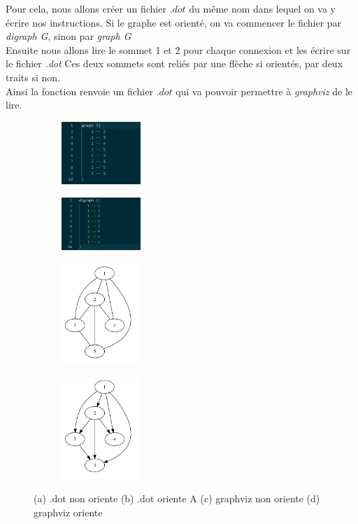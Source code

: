 \documentclass[a4paper]{article}
\begin{document}
Pour cela, nous allons créer un fichier $.dot$ du même nom dans lequel on va y écrire nos instructions.
Si le graphe est orienté, on va commencer le fichier par \emph{digraph G}, sinon par \emph{graph G}\\
Ensuite nous allons lire le sommet 1 et 2 pour chaque connexion et les écrire sur le fichier \emph{.dot}
Ces deux sommets sont reliés par une flèche si orientés, par deux traits si non.\\
Ainsi la fonction renvoie un fichier $.dot$ qui va pouvoir permettre à \emph{graphviz} de le lire.\\  
\hfill
\begin{figure}[htp]
    \centering
    \begin{subfigure}{0.225\textwidth}
      \centering
      \includegraphics[width=3cm]{./Photos/dot_non_oriente.png}
      \caption{}
    \end{subfigure}%
    \hfill
    \begin{subfigure}{0.225\textwidth}
      \centering
      \includegraphics[width=3cm]{./Photos/dot_oriente.png}
      \caption{}
    \end{subfigure}%
    \hfill
    \begin{subfigure}{0.225\textwidth}
        \centering
        \includegraphics[width=3cm]{./Photos/graphviz_non_oriente.png}
        \caption{}
    \end{subfigure}%
    \hfill
    \begin{subfigure}{0.225\textwidth}
        \centering
        \includegraphics[width=3cm]{./Photos/graphviz_oriente.png}
        \caption{}
    \end{subfigure}
  \caption { (a) .dot non oriente (b) .dot oriente A (c) graphviz non oriente (d) graphviz oriente}
\end{figure}
\end{document}
